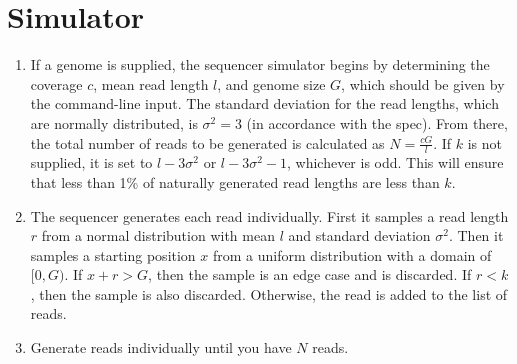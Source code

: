 \documentclass[10pt,letterpaper]{article}
\begin{document}
\section*{Simulator}
\begin{enumerate}
 \item If a genome is supplied, the sequencer simulator begins by determining the coverage $c$, mean read length $l$, and genome size $G$, which should be given by the command-line input. The standard deviation for the read lengths, which are normally distributed, is $\sigma^2 = 3$ (in accordance with the spec). From there, the total number of reads to be generated is calculated as $N = \frac{cG}{l}$. If $k$ is not supplied, it is set to $l - 3\sigma^2$ or $l - 3\sigma^2 - 1$, whichever is odd. This will ensure that less than 1\% of naturally generated read lengths are less than $k$.
 \item The sequencer generates each read individually. First it samples a read length $r$ from a normal distribution with mean $l$ and standard deviation $\sigma^2$. Then it samples a starting position $x$ from a uniform distribution with a domain of $[0,G)$. If $x + r > G$, then the sample is an edge case and is discarded. If $r < k$, then the sample is also discarded. Otherwise, the read is added to the list of reads.
 \item Generate reads individually until you have $N$ reads.
\end{enumerate}
\end{document}
